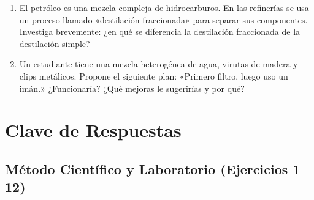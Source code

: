 \documentclass[12pt, a4paper]{article}
\begin{document}
\begin{enumerate}[leftmargin=*, resume]
  \item \dificil{} El petróleo es una mezcla compleja de hidrocarburos. En las refinerías se usa un proceso llamado «destilación fraccionada» para separar sus componentes. Investiga brevemente: ¿en qué se diferencia la destilación fraccionada de la destilación simple?

  \item \dificil{} Un estudiante tiene una mezcla heterogénea de agua, virutas de madera y clips metálicos. Propone el siguiente plan: «Primero filtro, luego uso un imán.» ¿Funcionaría? ¿Qué mejoras le sugerirías y por qué?
\end{enumerate}

\newpage

\section{Clave de Respuestas}

\subsection*{Método Científico y Laboratorio (Ejercicios 1--12)}
\end{document}
